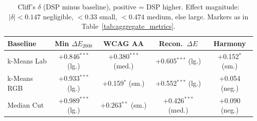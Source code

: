 \begin{table}[htbp]
\centering
\caption{Cliff's $\delta$ (DSP minus baseline), positive = DSP higher. Effect magnitude: $|\delta|<0.147$ negligible, $<0.33$ small, $<0.474$ medium, else large. Markers as in Table~\ref{tab:aggregate_metrics}.}
\label{tab:cliffs_delta}
\setlength{\tabcolsep}{5pt}
\begin{tabular}{lcccc}
\hline\hline
Baseline & Min $\Delta E_{2000}$ & WCAG AA & Recon.\ $\Delta E$ & Harmony \\
\hline
k-Means Lab & +0.846$^{\mathrm{***}}$ {\scriptsize(lg.)} & +0.380$^{\mathrm{***}}$ {\scriptsize(med.)} & +0.605$^{\mathrm{***}}$ {\scriptsize(lg.)} & +0.152$^{\mathrm{*}}$ {\scriptsize(sm.)} \\
k-Means RGB & +0.933$^{\mathrm{***}}$ {\scriptsize(lg.)} & +0.159$^{\mathrm{*}}$ {\scriptsize(sm.)} & +0.552$^{\mathrm{***}}$ {\scriptsize(lg.)} & +0.054 {\scriptsize(neg.)} \\
Median Cut & +0.989$^{\mathrm{***}}$ {\scriptsize(lg.)} & +0.263$^{\mathrm{**}}$ {\scriptsize(sm.)} & +0.426$^{\mathrm{***}}$ {\scriptsize(med.)} & +0.090 {\scriptsize(neg.)} \\
\hline\hline
\end{tabular}
\end{table}